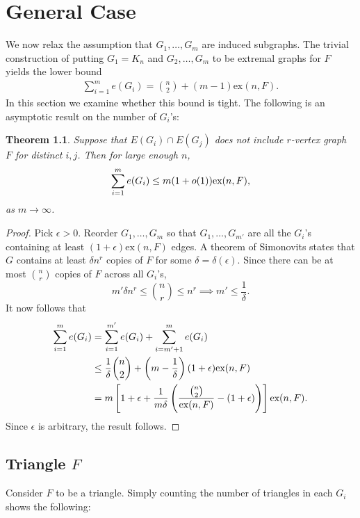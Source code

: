 \documentclass[12pt]{report}
\newtheorem{theorem}{Theorem}[chapter]
\begin{document}
\chapter{General Case}

We now relax the assumption that $G_1, \dots, G_m$ are induced subgraphs. The trivial construction
of putting $G_1 = K_n$ and $G_2, \ldots, G_m$ to be extremal graphs for $F$ yields the lower bound
\begin{gather}
	\sum_{i = 1}^m e(G_i) = \binom{n}{2} + (m - 1)\text{ex}(n, F).
\end{gather}
In this section we examine whether this bound is tight. The following is an asymptotic result on the
number of $G_i$'s:

\begin{theorem}
	Suppose that $E(G_i) \cap E(G_j)$ does not include $r$-vertex graph $F$ for distinct $i, j$. Then
	for large enough $n$,
	\[
		\sum_{i = 1}^m e(G_i) \leq m(1 + o(1))\textnormal{ex}(n, F),
	\]
	as $m \to \infty$.
\end{theorem}

\begin{proof}
  Pick $\epsilon > 0$. Reorder $G_1, \ldots, G_m$ so that $G_1, \ldots, G_{m'}$ are all the $G_i$'s
  containing at least $(1 + \epsilon)\text{ex}(n, F)$ edges. A theorem of Simonovits states that $G$
  contains at least $\delta n^r$ copies of $F$ for some $\delta = \delta(\epsilon)$. Since there can
  be at most $\binom{n}{r}$ copies of $F$ across all $G_i$'s, 
  \[
    m'\delta n^{r} \leq \binom{n}{r} \leq n^r \implies m' \leq \frac{1}{\delta}.
  \]
  It now follows that
  \begin{align*}
    \sum_{i = 1}^m e(G_i) 
    &= \sum_{i = 1}^{m'} e(G_i) + \sum_{i = m' + 1}^m e(G_i) \\
    &\leq \frac{1}{\delta}\binom{n}{2} + \left(m - \frac{1}{\delta}\right)(1 + \epsilon)\text{ex}(n, F) \\
    &= m\left[1 + \epsilon + \frac{1}{m\delta}\left(\frac{\binom{n}{2}}{\textnormal{ex}(n, F)} - (1 + \epsilon)\right)\right]\textnormal{ex}(n, F).
  \end{align*}
  Since $\epsilon$ is arbitrary, the result follows.
\end{proof}


\section{Triangle $F$}

Consider $F$ to be a triangle. Simply counting the number of triangles in each $G_i$ shows the
following:
\end{document}
